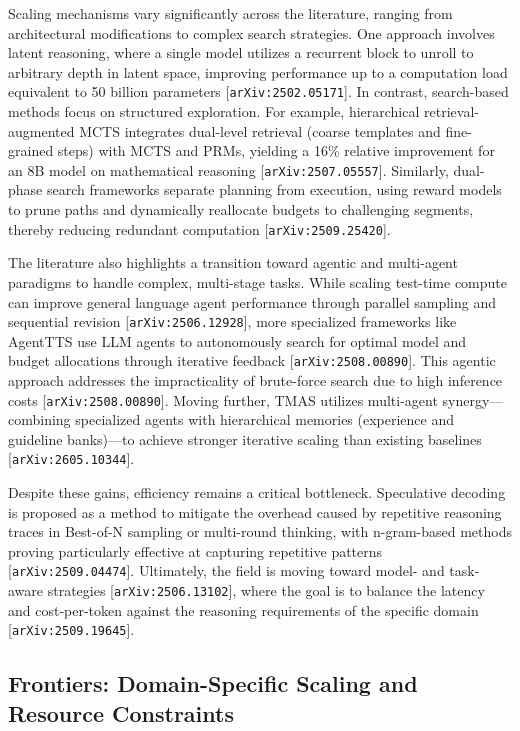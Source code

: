 \documentclass[11pt]{article}
\begin{document}
Scaling mechanisms vary significantly across the literature, ranging from architectural modifications to complex search strategies. One approach involves latent reasoning, where a single model utilizes a recurrent block to unroll to arbitrary depth in latent space, improving performance up to a computation load equivalent to 50 billion parameters [\texttt{arXiv:2502.05171}]. In contrast, search-based methods focus on structured exploration. For example, hierarchical retrieval-augmented MCTS integrates dual-level retrieval (coarse templates and fine-grained steps) with MCTS and PRMs, yielding a 16\% relative improvement for an 8B model on mathematical reasoning [\texttt{arXiv:2507.05557}]. Similarly, dual-phase search frameworks separate planning from execution, using reward models to prune paths and dynamically reallocate budgets to challenging segments, thereby reducing redundant computation [\texttt{arXiv:2509.25420}].

The literature also highlights a transition toward agentic and multi-agent paradigms to handle complex, multi-stage tasks. While scaling test-time compute can improve general language agent performance through parallel sampling and sequential revision [\texttt{arXiv:2506.12928}], more specialized frameworks like AgentTTS use LLM agents to autonomously search for optimal model and budget allocations through iterative feedback [\texttt{arXiv:2508.00890}]. This agentic approach addresses the impracticality of brute-force search due to high inference costs [\texttt{arXiv:2508.00890}]. Moving further, TMAS utilizes multi-agent synergy—combining specialized agents with hierarchical memories (experience and guideline banks)—to achieve stronger iterative scaling than existing baselines [\texttt{arXiv:2605.10344}].

Despite these gains, efficiency remains a critical bottleneck. Speculative decoding is proposed as a method to mitigate the overhead caused by repetitive reasoning traces in Best-of-N sampling or multi-round thinking, with n-gram-based methods proving particularly effective at capturing repetitive patterns [\texttt{arXiv:2509.04474}]. Ultimately, the field is moving toward model- and task-aware strategies [\texttt{arXiv:2506.13102}], where the goal is to balance the latency and cost-per-token against the reasoning requirements of the specific domain [\texttt{arXiv:2509.19645}].

\subsection{Frontiers: Domain-Specific Scaling and Resource Constraints}
\end{document}
